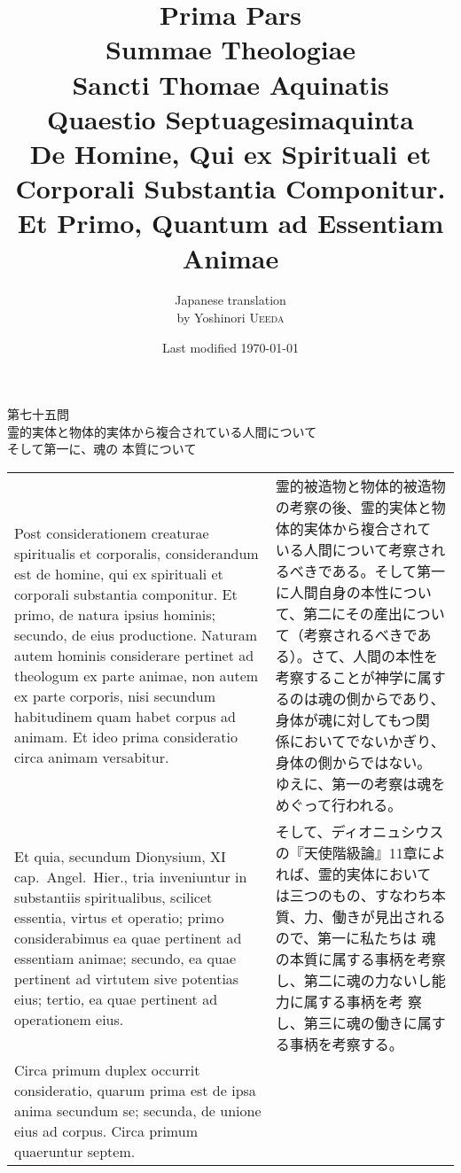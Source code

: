 \documentclass[paper=a4paper,fontsize=10pt,jafontsize=9pt,titlepage]{jlreq}
\title{{\bfseries Prima Pars}\\{\Huge Summae Theologiae}\\Sancti Thomae
Aquinatis\\{\sffamily Quaestio Septuagesimaquinta}\\{\bfseries De Homine,
Qui ex Spirituali et Corporali Substantia Componitur.\\ Et Primo,
Quantum ad Essentiam Animae}}
\author{Japanese translation\\by Yoshinori {\scshape Ueeda}}
\date{Last modified \today}
\begin{document}
\maketitle

\begin{center}
{\Large 第七十五問\\
霊的実体と物体的実体から複合されている人間について\\そして第一に、魂の
 本質について}
\end{center}


\begin{longtable}{p{21em}p{21em}}

Post considerationem creaturae spiritualis et corporalis,
considerandum est de homine, qui ex spirituali et corporali substantia
componitur. Et primo, de natura ipsius hominis; secundo, de eius
productione. Naturam autem hominis considerare pertinet ad theologum
ex parte animae, non autem ex parte corporis, nisi secundum
habitudinem quam habet corpus ad animam. Et ideo prima consideratio
circa animam versabitur. 

&

霊的被造物と物体的被造物の考察の後、霊的実体と物体的実体から複合されて
いる人間について考察されるべきである。そして第一に人間自身の本性につい
て、第二にその産出について（考察されるべきである）。さて、人間の本性を
考察することが神学に属するのは魂の側からであり、身体が魂に対してもつ関
係においてでないかぎり、身体の側からではない。
ゆえに、第一の考察は魂をめぐって行われる。

\\

Et quia, secundum Dionysium, XI
cap.~Angel.~Hier., tria inveniuntur in substantiis spiritualibus,
scilicet essentia, virtus et operatio; primo considerabimus ea quae
pertinent ad essentiam animae; secundo, ea quae pertinent ad virtutem
sive potentias eius; tertio, ea quae pertinent ad operationem
eius. 





& 

そして、ディオニュシウスの『天使階級論』11章によれば、霊的実体において
 は三つのもの、すなわち本質、力、働きが見出されるので、第一に私たちは
 魂の本質に属する事柄を考察し、第二に魂の力ないし能力に属する事柄を考
 察し、第三に魂の働きに属する事柄を考察する。


\\


Circa primum duplex occurrit consideratio, quarum prima est de
ipsa anima secundum se; secunda, de unione eius ad corpus. Circa
primum quaeruntur septem. 



\end{longtable}
\end{document}
